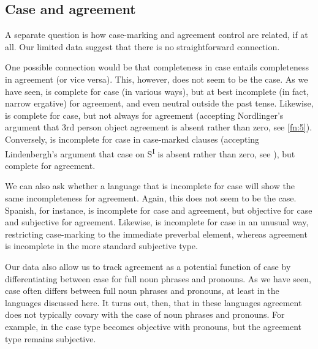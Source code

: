 \documentclass[output=paper]{langsci/langscibook}
\begin{document}
\subsection{Case and agreement}\label{sec:11.5.4}

A separate question is how case-marking and agreement control are related, if
at all. Our limited data suggest that there is no straightforward connection.

One possible connection would be that completeness in case entails completeness
in agreement (or vice versa). This, however, does not seem to be the case. As
we have seen,  is complete for case (in various ways), but
at best incomplete (in fact, narrow ergative) for agreement, and even neutral
outside the past tense. Likewise,  is complete for case, but not
always for agreement (accepting Nordlinger’s argument that 3rd person object
agreement is absent rather than zero, see \cref{fn:5}). Conversely,  is incomplete for case in case-marked clauses (accepting Lindenbergh’s
argument that case on S\textsuperscript{I} is absent rather than zero, see
), but complete for agreement.

We can also ask whether a language that is incomplete for case will show the
same incompleteness for agreement. Again, this does not seem to be the case.
Spanish, for instance, is incomplete for case and agreement, but objective for
case and subjective for agreement. Likewise,  is incomplete for
case in an unusual way, restricting case-marking to the immediate preverbal
element, whereas agreement is incomplete in the more standard subjective
 type.

Our data also allow us to track agreement  as a potential
function of case  by differentiating between case for full noun
phrases and pronouns. As we have seen, case  often differs
between full noun phrases and pronouns, at least in the languages discussed
here. It turns out, then, that in these languages agreement 
does not typically covary with the case  of noun phrases and
pronouns. For example, in  the case  type becomes
objective with pronouns, but the agreement  type remains subjective.
\end{document}
